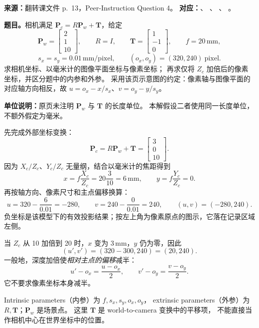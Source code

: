 \nopagebreak[4]

\textbf{来源：}翻转课文件 p.~13，Peer-Instruction Question 4。
\textbf{对应：}、
、
、
。

\textbf{题目。}相机满足 $\bm P_c=R\bm P_w+\bm T$，给定
\[
  \bm P_w=\begin{bmatrix}2\\1\\10\end{bmatrix},\qquad
  R=I,\qquad
  \bm T=\begin{bmatrix}1\\-1\\0\end{bmatrix},\qquad
  f=20\,\mathrm{mm},
\]
\[
  s_x=s_y=0.01\,\mathrm{mm/pixel},\qquad
  (o_x,o_y)=(320,240)\ \mathrm{pixel}.
\]
求相机坐标、以毫米计的图像平面坐标与像素坐标；
再求仅将 $Z_c$ 加倍后的像素坐标，并区分题中的内参和外参。
采用该页示意图的约定：像素轴与图像平面的对应轴方向相反，故
$u=o_x-x/s_x$、$v=o_y-y/s_y$。

\begin{checkedsolution}
\textbf{单位说明：}原页未注明 $\bm P_w$ 与 $\bm T$ 的长度单位。
本解假设二者使用同一长度单位，不额外假定为毫米。

先完成外部坐标变换：
\[
  \bm P_c=R\bm P_w+\bm T
  =\boxed{\begin{bmatrix}3\\0\\10\end{bmatrix}}.
\]
因为 $X_c/Z_c$、$Y_c/Z_c$ 无量纲，结合以毫米计的焦距得到
\[
  x=f\frac{X_c}{Z_c}=20\frac3{10}=6\,\mathrm{mm},\qquad
  y=f\frac{Y_c}{Z_c}=0.
\]
再按轴方向、像素尺寸和主点偏移换算：
\[
  u=320-\frac6{0.01}=-280,\qquad
  v=240-\frac0{0.01}=240,
  \qquad \boxed{(u,v)=(-280,240)}.
\]
负坐标是该模型下的有效投影结果；按左上角为像素原点的图示，它落在记录区域左侧。

当 $Z_c$ 从 10 加倍到 20 时，$x$ 变为 $3\,\mathrm{mm}$，$y$ 仍为零，因此
\[
  \boxed{(u',v')=(320-300,240)=(20,240)}.
\]
一般地，深度加倍使\emph{相对主点的偏移}减半：
\[
  u'-o_x=\frac{u-o_x}{2},\qquad
  v'-o_y=\frac{v-o_y}{2}.
\]
它不要求像素坐标本身减半。

Intrinsic parameters（内参）为 $f,s_x,s_y,o_x,o_y$，
extrinsic parameters（外参）为 $R,\bm T$；$\bm P_w$ 是场景点。
这里 $\bm T$ 是 world-to-camera 变换中的平移项，
不能直接当作相机中心在世界坐标中的位置。
\end{checkedsolution}

